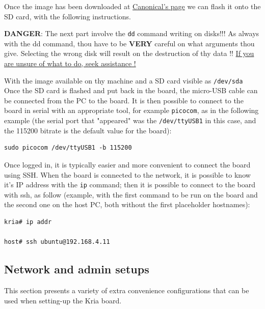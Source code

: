 \documentclass[10pt]{article}
\begin{document}
Once the image has been downloaded at \href{https://ubuntu.com/download/amd-xilinx}{Canonical's page}
we can flash it onto the SD card, with the following instructions.

\begin{tcolorbox}[colback=red!5!white,colframe=red!75!black]
\textbf{DANGER}: The next part involve the \texttt{dd} command writing on disks!!!
As always with the dd command, thou have to be \textbf{VERY} careful on what arguments
thou give. Selecting the wrong disk will result on the destruction of
thy data !!
\uline{If you are unsure of what to do, seek assistance !}
\end{tcolorbox}

With the image available on thy machine and a SD card visible as \texttt{/dev/sda}
Once the SD card is flashed and put back in the board, the micro-USB cable can be
connected from the PC to the board. It is then possible to
connect to the board in serial with an appropriate tool, for example \texttt{picocom},
as in the following example (the serial port that "appeared" was the \texttt{/dev/ttyUSB1} in this case,
and the 115200 bitrate is the default value for the board):

\begin{verbatim}
sudo picocom /dev/ttyUSB1 -b 115200
\end{verbatim}

Once logged in, it is typically easier and more convenient to connect the board
using SSH. When the board is connected to the network, it is possible to know
it's IP address with the \texttt{ip} command; then it is possible to connect to
the board with ssh, as follow (example, with the first command to be run on the board
and the second one on the host PC, both without the first placeholder hostnames):


\begin{verbatim}
kria# ip addr

host# ssh ubuntu@192.168.4.11
\end{verbatim}

\subsection{Network and admin setups}
\label{sec:org8dad69b}
This section presents a variety of extra convenience configurations
that can be used when setting-up the Kria board.
\end{document}
